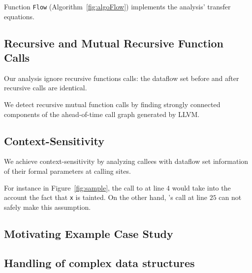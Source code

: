 Function \texttt{Flow} (Algorithm~\ref{fig:algoFlow})
implements the analysis' transfer equations.

\subsection{Recursive and Mutual Recursive Function Calls} 

Our analysis ignore recursive functions calls: the dataflow set
before and after recursive calls are identical. 

We detect recursive mutual function calls by finding strongly
connected components of the ahead-of-time call graph generated
by LLVM. 

\subsection{Context-Sensitivity} 

We achieve context-sensitivity by analyzing callees
with dataflow set information of their formal parameters
at calling sites.

For instance in Figure~\ref{fig:sample}, the call to \even{} at
line $4$ would take into the account the fact that \texttt{x}
is tainted.
On the other hand, \even{}'s call at line $25$ can not safely
make this assumption.

\subsection{Motivating Example Case Study}\label{sec:sampleSummary}

\subsection{Handling of complex data structures}
